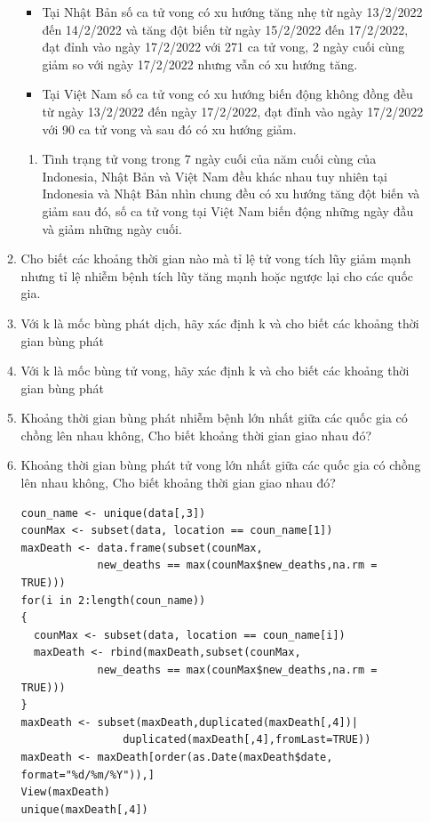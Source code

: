 \documentclass[a4paper]{article}
\theoremstyle{definition}
\begin{document}
\begin{enumerate}[i)]
\begin{enumerate}[1)]
\begin{itemize}
   \item Tại Nhật Bản  số ca tử vong có xu hướng tăng nhẹ từ ngày 13/2/2022 đến 14/2/2022 và tăng đột biến từ ngày 15/2/2022 đến 17/2/2022, đạt đỉnh vào ngày 17/2/2022 với 271 ca tử vong, 2 ngày cuối cùng giảm so với ngày 17/2/2022 nhưng vẫn có xu hướng tăng.
   \item Tại Việt Nam số ca tử vong có xu hướng biến động không đồng đều từ ngày 13/2/2022 đến ngày 17/2/2022, đạt đỉnh vào ngày 17/2/2022 với 90 ca tử vong và sau đó có xu hướng giảm.
   \end{itemize}
	\begin{enumerate}[=>]
	\item Tình trạng tử vong trong 7 ngày  cuối của năm cuối cùng của Indonesia, Nhật Bản và Việt Nam đều khác nhau tuy nhiên tại Indonesia và Nhật Bản nhìn chung đều có xu hướng tăng đột biến và giảm sau đó, số ca tử vong tại Việt Nam biến động những ngày đầu và giảm những ngày cuối.
	\end{enumerate}
        \item Cho biết các khoảng thời gian nào mà tỉ lệ tử vong tích lũy giảm mạnh nhưng tỉ lệ nhiễm bệnh tích lũy tăng mạnh hoặc ngược lại cho các quốc gia.
        \item Với k là mốc bùng phát dịch, hãy xác định k và cho biết các khoảng thời gian bùng phát
        \item Với k là mốc bùng tử vong, hãy xác định k và cho biết các khoảng thời gian bùng phát
        \item Khoảng thời gian bùng phát nhiễm bệnh lớn nhất giữa các quốc gia có chồng lên nhau không, Cho biết khoảng thời gian giao nhau đó?
        \item Khoảng thời gian bùng phát tử vong lớn nhất giữa các quốc gia có chồng lên nhau không, Cho biết khoảng thời gian giao nhau đó?
\lstset{
    title=Source code for x7}
\begin{lstlisting}[frame=single]  
coun_name <- unique(data[,3])
counMax <- subset(data, location == coun_name[1])
maxDeath <- data.frame(subset(counMax,
            new_deaths == max(counMax$new_deaths,na.rm = TRUE)))
for(i in 2:length(coun_name))
{
  counMax <- subset(data, location == coun_name[i])
  maxDeath <- rbind(maxDeath,subset(counMax,
            new_deaths == max(counMax$new_deaths,na.rm = TRUE)))
}
maxDeath <- subset(maxDeath,duplicated(maxDeath[,4])|
                duplicated(maxDeath[,4],fromLast=TRUE))
maxDeath <- maxDeath[order(as.Date(maxDeath$date, format="%d/%m/%Y")),]
View(maxDeath)
unique(maxDeath[,4])
\end{lstlisting}

\end{enumerate}
\end{enumerate}
\end{document}
